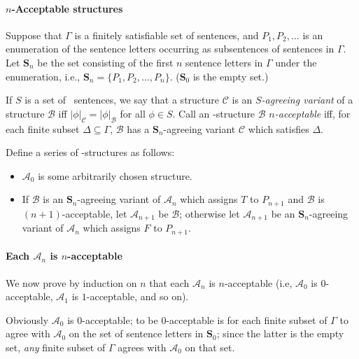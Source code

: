 
\paragraph{$n$-Acceptable structures}
Suppose that $\Gamma$ is a finitely satisfiable set of sentences, and $P_{1},P_{2},\ldots$ is an enumeration of the sentence letters occurring as subsentences of sentences in $\Gamma$. Let $\mathbf{S}_{n}$ be the set consisting of the first $n$ sentence letters in $\Gamma$ under the enumeration, i.e., $\mathbf{S}_{n} = \{P_{1},P_{2},\ldots,P_{n}\}$. ($\mathbf{S}_{0}$ is the empty set.)
    
     If $S$ is a set of \lone\ sentences, we say that a structure $\mathscr{C}$ is an \emph{$S$-agreeing variant} of a structure $\mathscr{B}$ iff $|\phi|_{\mathscr{C}}=|\phi|_{\mathscr{B}}$ for all $\phi \in S$.
    Call an \lone-structure $\mathscr{B}$ \emph{$n$-acceptable} iff, for each finite subset $\Delta \subseteq \Gamma$, $\mathscr{B}$ has a $\mathbf{S}_{n}$-agreeing variant $\mathscr{C}$ which satisfies $\Delta$.


Define a series of \lone-structures as follows: \begin{itemize}
      \item $\mathscr{A}_{0}$ is some arbitrarily chosen structure.
      \item If $\mathscr{B}$ is an $\mathbf{S}_{n}$-agreeing variant of $\mathscr{A}_{n}$ which assigns $T$ to $P_{n+1}$ and $\mathscr{B}$ is $(n+1)$-acceptable, let $\mathscr{A}_{n+1}$ be $\mathscr{B}$; otherwise let $\mathscr{A}_{n+1}$ be an $\mathbf{S}_{n}$-agreeing variant of $\mathscr{A}_{n}$ which assigns $F$ to $P_{n+1}$.
    \end{itemize} 
    
  \paragraph{Each $\mathscr{A}_{n}$ is $n$-acceptable}  
    
We now prove by induction on $n$ that each $\mathscr{A}_{n}$ is $n$-acceptable (i.e, $\mathscr{A}_{0}$ is $0$-acceptable, $\mathscr{A}_{1}$ is $1$-acceptable, and so on). 

Obviously $\mathscr{A}_{0}$ is $0$-acceptable; to be $0$-acceptable is for each finite subset of $\Gamma$ to agree with $\mathscr{A}_{0}$ on the set of sentence letters in $\mathbf{S}_{0}$; since the latter is the empty set, \emph{any} finite subset of $\Gamma$ agrees with $\mathscr{A}_{0}$ on that set.

